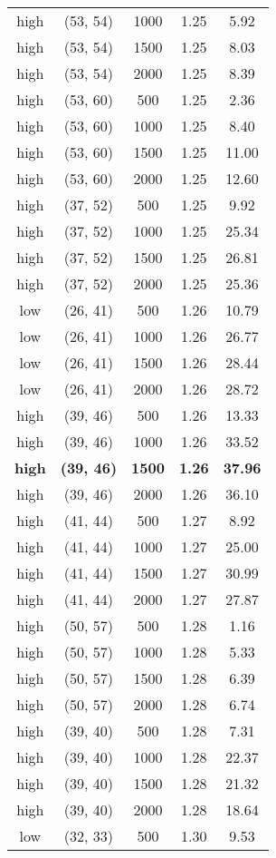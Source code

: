 \begin{tabular}{c c c c c}
high & (53, 54) &  1000 & 1.25 & 5.92 \\
high & (53, 54) &  1500 & 1.25 & 8.03 \\
high & (53, 54) &  2000 & 1.25 & 8.39 \\
high & (53, 60) &  500 & 1.25 & 2.36 \\
high & (53, 60) &  1000 & 1.25 & 8.40 \\
high & (53, 60) &  1500 & 1.25 & 11.00 \\
high & (53, 60) &  2000 & 1.25 & 12.60 \\
high & (37, 52) &  500 & 1.25 & 9.92 \\
high & (37, 52) &  1000 & 1.25 & 25.34 \\
high & (37, 52) &  1500 & 1.25 & 26.81 \\
high & (37, 52) &  2000 & 1.25 & 25.36 \\
low & (26, 41) &  500 & 1.26 & 10.79 \\
low & (26, 41) &  1000 & 1.26 & 26.77 \\
low & (26, 41) &  1500 & 1.26 & 28.44 \\
low & (26, 41) &  2000 & 1.26 & 28.72 \\
high & (39, 46) &  500 & 1.26 & 13.33 \\
high & (39, 46) &  1000 & 1.26 & 33.52 \\
\textbf{high} & \textbf{(39, 46)} & \textbf{ 1500} & \textbf{1.26} & \textbf{37.96} \\
high & (39, 46) &  2000 & 1.26 & 36.10 \\
high & (41, 44) &  500 & 1.27 & 8.92 \\
high & (41, 44) &  1000 & 1.27 & 25.00 \\
high & (41, 44) &  1500 & 1.27 & 30.99 \\
high & (41, 44) &  2000 & 1.27 & 27.87 \\
high & (50, 57) &  500 & 1.28 & 1.16 \\
high & (50, 57) &  1000 & 1.28 & 5.33 \\
high & (50, 57) &  1500 & 1.28 & 6.39 \\
high & (50, 57) &  2000 & 1.28 & 6.74 \\
high & (39, 40) &  500 & 1.28 & 7.31 \\
high & (39, 40) &  1000 & 1.28 & 22.37 \\
high & (39, 40) &  1500 & 1.28 & 21.32 \\
high & (39, 40) &  2000 & 1.28 & 18.64 \\
low & (32, 33) &  500 & 1.30 & 9.53 \\

\end{tabular}
